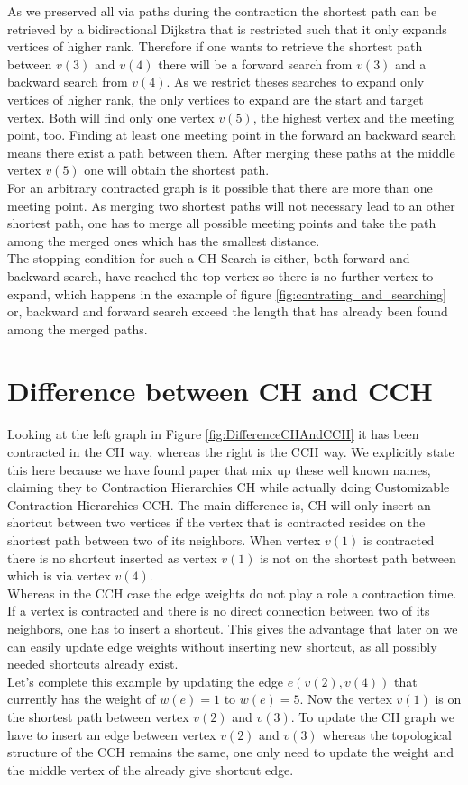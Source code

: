 As we preserved all via paths during the contraction the shortest path can be retrieved by a bidirectional Dijkstra that is restricted such that it only expands vertices of higher rank. 
Therefore if one wants to retrieve the shortest path between $v(3)$ and $v(4)$ there will be a forward search from $v(3)$ and a backward search from $v(4)$. As we restrict theses searches to expand only vertices
of higher rank, the only vertices to expand are the start and target vertex. Both will find only one vertex $v(5)$, the highest vertex and the meeting point, too. Finding at least one meeting point in the forward an backward search means there exist a path between them.
After merging these paths at the middle vertex $v(5)$ one will obtain the shortest path.
\\
For an arbitrary contracted graph is it possible that there are more than one meeting point. As merging two shortest paths will not necessary lead to an other shortest path, one has to merge
all possible meeting points and take the path among the merged ones which has the smallest distance. 
\\ 
The stopping condition for such a CH-Search is either, both forward and backward search, have reached the top vertex so there is no further vertex to expand, which happens in the example of figure \ref{fig:contrating_and_searching} or, backward and forward search exceed 
the length that has already been found among the merged paths.


\section{Difference between CH and CCH}

Looking at the left graph in Figure \ref*{fig:DifferenceCHAndCCH} it has been contracted in the CH way, whereas the right is the CCH way. We explicitly state this here because 
we have found paper \cite{Ouyang_2020} that mix up these well known names, claiming they to Contraction Hierarchies CH while actually doing Customizable Contraction Hierarchies CCH. 
The main difference is, CH will only insert an shortcut between two vertices if the vertex that is contracted resides on the shortest path between two of its neighbors. 
When vertex $v(1)$ is contracted there is no shortcut inserted as vertex $v(1)$ is not on the shortest path between which is via vertex $v(4)$.
\\
Whereas in the CCH case the edge weights do not play a role a contraction time. If a vertex is contracted and there is no direct connection between two of its neighbors, one has to insert a shortcut. This gives
the advantage that later on we can easily update edge weights without inserting new shortcut, as all possibly needed shortcuts already exist.
\\ 
Let's complete this example by updating the edge $e(v(2), v(4))$ that currently has the weight of $w(e)=1$ to $w(e) = 5$. Now the vertex $v(1)$ is on the shortest path between vertex $v(2)$ and $v(3)$. 
To update the CH graph we have to insert an edge between vertex $v(2)$ and $v(3)$ whereas the topological structure of the CCH remains the same, one only need to update the weight and the middle vertex of the already give shortcut edge.

